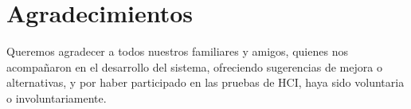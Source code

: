 \chapter*{Agradecimientos}

Queremos agradecer a todos nuestros familiares y amigos, quienes nos acompañaron en el desarrollo del sistema, ofreciendo sugerencias de mejora o alternativas, y por haber participado en las pruebas de HCI, haya sido voluntaria o involuntariamente.
